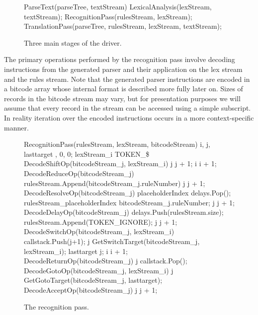 \documentclass[a4paper,11pt]{article}
\begin{document}
\begin{figure}[!ht]
\centering
\begin{gcl}
\PROC ParseText(parseTree, textStream)
LexicalAnalysis(lexStream, textStream);
RecognitionPass(rulesStream, lexStream);
TranslationPass(parseTree, rulesStream, lexStream, textStream);
\CORP
\end{gcl}
\vspace{-2.5\baselineskip}
\caption{Three main stages of the driver.}
\end{figure}

The primary operations performed by the recognition pass involve decoding instructions from the generated parser and their application on the lex stream and the rules stream. 
Note that the generated parser instructions are encoded in a bitcode array whose internal format is described more fully later on.
Sizes of records in the bitcode stream may vary, but for presentation purposes we will assume that every record in the stream can be accessed using a simple subscript.
In reality iteration over the encoded instructions occurs in a more context-specific manner.

\clearpage
\begin{figure}[!ht]
\centering
\begin{gcl}
\PROC RecognitionPass(rulesStream, lexStream, bitcodeStream)
    i, j, lasttarget , 0, 0;    
    \DO lexStream_i \neq TOKEN\_\$ \rightarrow
      \IF DecodeShiftOp(bitcodeStream_j, lexStream_i) \rightarrow
      \quad j \becomes j + 1;
      \quad i \becomes i + 1;
      \BAR DecodeReduceOp(bitcodeStream_j) \rightarrow
      \quad rulesStream.Append(bitcodeStream_j.ruleNumber)
      \quad j \becomes j + 1;
      \BAR DecodeResolveOp(bitcodeStream_j) \rightarrow
      \quad placeholderIndex \becomes delays.Pop();
      \quad rulesStream_{placeholderIndex} \becomes bitcodeStream_j.ruleNumber;
      \quad j \becomes j + 1;
      \BAR DecodeDelayOp(bitcodeStream_j) \rightarrow
      \quad delays.Push(rulesStream.size);
      \quad rulesStream.Append(TOKEN\_IGNORE);
      \quad j \becomes j + 1;
      \BAR DecodeSwitchOp(bitcodeStream_j, lexStream_i) \rightarrow
      \quad callstack.Push(j+1);
      \quad j \becomes GetSwitchTarget(bitcodeStream_j, lexStream_i);
      \quad lasttarget \becomes j;
      \quad i \becomes i + 1;
      \BAR DecodeReturnOp(bitcodeStream_j) \rightarrow
      \quad j \becomes callstack.Pop();
      \BAR DecodeGotoOp(bitcodeStream_j, lexStream_i) \rightarrow
      \quad j \becomes GetGotoTarget(bitcodeStream_j, lasttarget);
      \BAR DecodeAcceptOp(bitcodeStream_j) \rightarrow
      \quad j \becomes j + 1;
    \FI
  \OD
\CORP
\end{gcl}
\vspace{-2.5\baselineskip}
\caption{The recognition pass.}
\end{figure}
\end{document}
